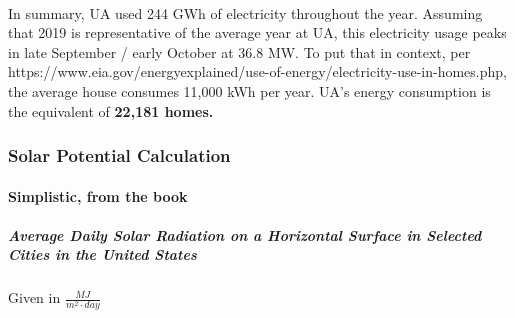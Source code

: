 \documentclass[11pt]{article}
\begin{document}
    \begin{center}
    \end{center}
    { \hspace*{\fill} \\}
    
    In summary, UA used 244 GWh of electricity throughout the year. Assuming
that 2019 is representative of the average year at UA, this electricity
usage peaks in late September / early October at 36.8 MW. To put that in
context, per
https://www.eia.gov/energyexplained/use-of-energy/electricity-use-in-homes.php,
the average house consumes 11,000 kWh per year. UA's energy consumption
is the equivalent of \textbf{22,181 homes.}

    \hypertarget{solar-potential-calculation}{%
\subsubsection{Solar Potential
Calculation}\label{solar-potential-calculation}}

    \hypertarget{simplistic-from-the-book}{%
\paragraph{Simplistic, from the book}\label{simplistic-from-the-book}}

    \hypertarget{average-daily-solar-radiation-on-a-horizontal-surface-in-selected-cities-in-the-united-states}{%
\subparagraph{Average Daily Solar Radiation on a Horizontal Surface in
Selected Cities in the United
States}\label{average-daily-solar-radiation-on-a-horizontal-surface-in-selected-cities-in-the-united-states}}

Given in \(\frac{MJ}{m^2 \cdot day}\)
\end{document}
